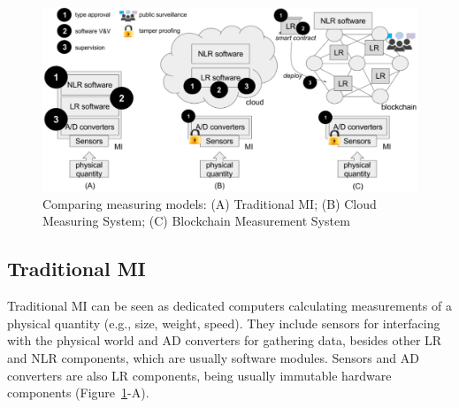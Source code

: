\documentclass[journal]{IEEEtran}
\begin{document}
\begin{figure}[!t]
\centering
\includegraphics[width=.69\textwidth]{measuring} %
\caption{Comparing measuring models: (A) Traditional MI; (B) Cloud Measuring System; (C) Blockchain Measurement System}
\label{f:compare}
\end{figure}

\subsection{Traditional MI}
\label{s:mi_traditional}
Traditional MI can be seen as dedicated computers calculating measurements of a physical quantity (e.g., size, weight, speed). They include sensors for interfacing with the physical world and AD converters for gathering data, besides other LR and NLR components, which are usually software modules. Sensors and AD converters are also LR components, being usually immutable hardware components (Figure~\ref{f:compare}-A).
\end{document}
